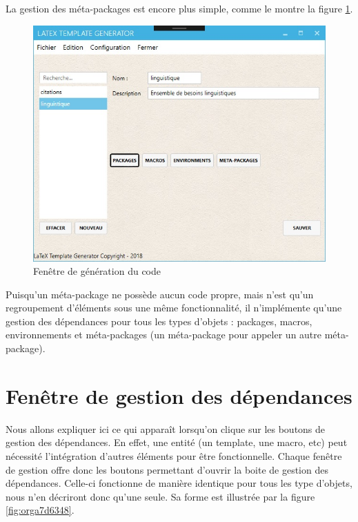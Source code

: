 \documentclass[a4paper, oneside]{article}
\begin{document}
La gestion des méta-packages est encore plus simple, comme le montre la figure \ref{fig:orgd87d7a9}.

\begin{figure}[htbp]
\centering
\includegraphics[width=.9\linewidth]{../Images/meta.jpg}
\caption{\label{fig:orgd87d7a9}
Fenêtre de génération du code}
\end{figure}

Puisqu'un méta-package ne possède aucun code propre, mais n'est qu'un
regroupement d'éléments sous une même fonctionnalité, il n'implémente qu'une
gestion des dépendances pour tous les types d'objets : packages, macros,
environnements et méta-packages (un méta-package pour appeler un autre
méta-package).

\section{Fenêtre de gestion des dépendances}
\label{sec:orgbe7d198}
\label{orge9adf42}

Nous allons expliquer ici ce qui apparaît lorsqu'on clique sur les boutons de
gestion des dépendances. En effet, une entité (un template, une macro, etc) peut
nécessité l'intégration d'autres éléments pour être fonctionnelle. Chaque
fenêtre de gestion offre donc les boutons permettant d'ouvrir la boite de
gestion des dépendances. Celle-ci fonctionne de manière identique pour tous les
type d'objets, nous n'en décriront donc qu'une seule. Sa forme est illustrée par
la figure \ref{fig:orga7d6348}.
\end{document}
